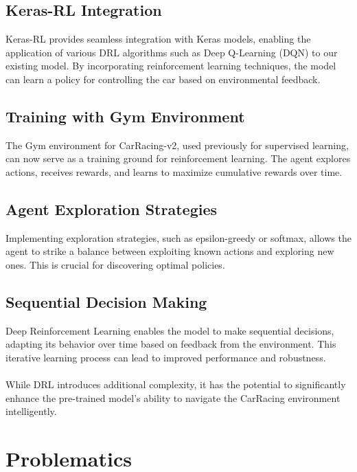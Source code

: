 \documentclass{article}
\begin{document}
\subsection{Keras-RL Integration}

Keras-RL provides seamless integration with Keras models, enabling the application of various DRL algorithms such as Deep Q-Learning (DQN) to our existing model. By incorporating reinforcement learning techniques, the model can learn a policy for controlling the car based on environmental feedback.

\subsection{Training with Gym Environment}

The Gym environment for CarRacing-v2, used previously for supervised learning, can now serve as a training ground for reinforcement learning. The agent explores actions, receives rewards, and learns to maximize cumulative rewards over time.

\subsection{Agent Exploration Strategies}

Implementing exploration strategies, such as epsilon-greedy or softmax, allows the agent to strike a balance between exploiting known actions and exploring new ones. This is crucial for discovering optimal policies.

\subsection{Sequential Decision Making}

Deep Reinforcement Learning enables the model to make sequential decisions, adapting its behavior over time based on feedback from the environment. This iterative learning process can lead to improved performance and robustness.
\\
\\
While DRL introduces additional complexity, it has the potential to significantly enhance the pre-trained model's ability to navigate the CarRacing environment intelligently.

\newpage

\section{Problematics}
\end{document}
